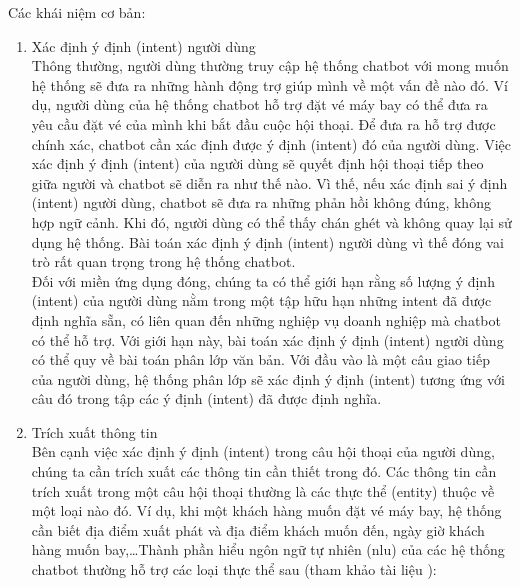 Các khái niệm cơ bản:
\begin{enumerate}
    \item Xác định ý định (intent) người dùng
          \\
          Thông thường, người dùng thường truy cập hệ thống chatbot với mong muốn hệ thống sẽ đưa ra những hành động trợ giúp mình về một vấn đề nào đó. Ví dụ, người dùng của hệ thống chatbot hỗ trợ đặt vé máy bay có thể đưa ra yêu cầu đặt vé của mình khi bắt đầu cuộc hội thoại. Để đưa ra hỗ trợ được chính xác, chatbot cần xác định được ý định (intent) đó của người dùng. Việc xác định ý định (intent) của người dùng sẽ quyết định hội thoại tiếp theo giữa người và chatbot sẽ diễn ra như thế nào. Vì thế, nếu xác định sai ý định (intent) người dùng, chatbot sẽ đưa ra những phản hồi không đúng, không hợp ngữ cảnh. Khi đó, người dùng có thể thấy chán ghét và không quay lại sử dụng hệ thống. Bài toán xác định ý định (intent) người dùng vì thế đóng vai trò rất quan trọng trong hệ thống chatbot.
          \\
          Đối với miền ứng dụng đóng, chúng ta có thể giới hạn rằng số lượng ý định (intent) của người dùng nằm trong một tập hữu hạn những intent đã được định nghĩa sẵn, có liên quan đến những nghiệp vụ doanh nghiệp mà chatbot có thể hỗ trợ. Với giới hạn này, bài toán xác định ý định (intent) người dùng có thể quy về bài toán phân lớp văn bản. Với đầu vào là một câu giao tiếp của người dùng, hệ thống phân lớp sẽ xác định ý định (intent) tương ứng với câu đó trong tập các ý định (intent) đã được định nghĩa.
	    \item Trích xuất thông tin
          \\
          Bên cạnh việc xác định ý định (intent) trong câu hội thoại của người dùng, chúng ta cần trích xuất các thông tin cần thiết trong đó. Các thông tin cần trích xuất trong một câu hội thoại thường là các thực thể (entity) thuộc về một loại nào đó. Ví dụ, khi một khách hàng muốn đặt vé máy bay, hệ thống cần biết địa điểm xuất phát và địa điểm khách muốn đến, ngày giờ khách hàng muốn bay,…Thành phần hiểu ngôn ngữ tự nhiên (\ac{nlu}) của các hệ thống chatbot thường hỗ trợ các loại thực thể sau (tham khảo tài liệu \cite{1}):


\end{enumerate}

